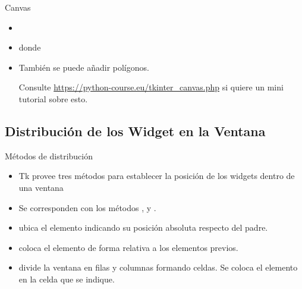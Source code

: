 \documentclass[10pt, envcountsect , spanish]{beamer}
\begin{document}
\begin{frame}[fragile]{Canvas}
\begin{itemize}
\begin{itemize}
\item {}
\item {} donde 
\item También se puede añadir polígonos. 

Consulte \url{https://python-course.eu/tkinter_canvas.php} si quiere un mini tutorial sobre esto.
\end{itemize}
\end{itemize}

%
%
%
%

\end{frame}




\subsection{Distribución de los Widget en la Ventana}


\begin{frame}{Métodos de distribución}

\begin{itemize} 
\item Tk provee tres métodos para establecer la posición de los  widgets dentro de una ventana
\item Se corresponden con los métodos ,    y .
\item  {} ubica el elemento indicando su posición absoluta respecto del padre.
\item  {} coloca el elemento de forma relativa a los elementos previos.
\item  {} divide la ventana en filas y columnas formando celdas. Se coloca el elemento en la celda que se indique.
\end{itemize}

\end{frame}
\end{document}

